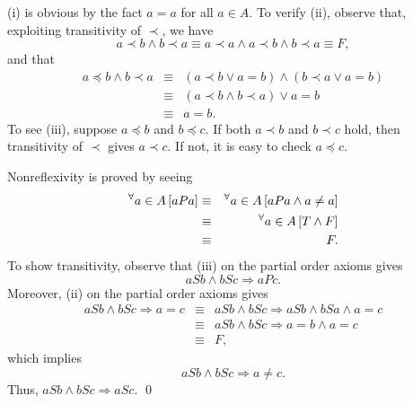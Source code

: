 \documentclass[a4paper,12pt]{article}
\begin{document}
\begin{sol}\leavevmode \par
	(i) is obvious by the fact \( a=a \) for all \( a \in A \).
	To verify (ii), observe that, exploiting transitivity of \( \prec \), we have
	\begin{equation*}
		a\prec b \wedge b \prec a
		\equiv
		a \prec a \wedge a\prec b \wedge b \prec a
		\equiv
		F,
	\end{equation*}
	and that
	\begin{eqnarray*}
		a \preceq b \wedge b \prec a
		&\equiv&
		(a\prec b \vee a=b) \wedge (b\prec a \vee a=b)\\
		&\equiv&
		(a\prec b \wedge b\prec a) \vee a=b\\
		&\equiv&
		a=b.
	\end{eqnarray*}
	To see (iii),
	suppose \(  a\preceq b \) and \(  b\preceq c \).
	If both \( a \prec b \) and \( b \prec c \) hold, then transitivity of \( \prec \)
	gives \( a\prec c \).
	If not, it is easy to check \( a \preceq c \).
	
	Nonreflexivity is proved by seeing
	\begin{eqnarray*}
		{}^{\forall}  a\in A\left[ aPa \right]
		&\equiv&
		{}^{\forall}  a\in A\left[ aPa \wedge a \neq a \right]\\
		&\equiv&
		{}^{\forall}  a \in A\left[ T \wedge F \right]\\
		&\equiv&
		F.
	\end{eqnarray*}
	To show transitivity,
	observe that (iii) on the partial order axioms gives
	\begin{equation*}
		aSb \wedge bSc \Rightarrow aPc.
	\end{equation*}
	Moreover, (ii) on the partial order axioms gives
	\begin{eqnarray*}
		aSb \wedge bSc \Rightarrow a=c
		&\equiv&
		aSb \wedge bSc \Rightarrow aSb \wedge bSa \wedge a=c\\
		&\equiv&
		aSb \wedge bSc \Rightarrow a=b \wedge a=c\\
		&\equiv&
		F,
	\end{eqnarray*}
	which implies
	\begin{equation*}
		aSb \wedge bSc \Rightarrow a\neq c.
	\end{equation*}
	Thus,
	\( aSb \wedge bSc \Rightarrow aSc \).
	\qed\end{sol}
\end{document}
